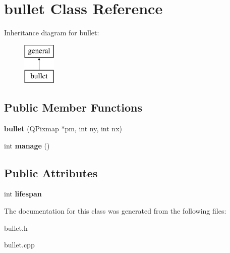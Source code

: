 \hypertarget{classbullet}{\section{bullet \-Class \-Reference}
\label{classbullet}
}
\-Inheritance diagram for bullet\-:\begin{figure}[H]
\begin{center}
\leavevmode
\includegraphics[height=2.000000cm]{classbullet}
\end{center}
\end{figure}
\subsection*{\-Public \-Member \-Functions}
\begin{DoxyCompactItemize}
\item 
\hypertarget{classbullet_aa62b1de309924a5a2daeb9ce7162068a}{{\bfseries bullet} (\-Q\-Pixmap $\ast$pm, int ny, int nx)}\label{classbullet_aa62b1de309924a5a2daeb9ce7162068a}

\item 
\hypertarget{classbullet_ae06a08d3012aec0b8454d2df38284cd0}{int {\bfseries manage} ()}\label{classbullet_ae06a08d3012aec0b8454d2df38284cd0}

\end{DoxyCompactItemize}
\subsection*{\-Public \-Attributes}
\begin{DoxyCompactItemize}
\item 
\hypertarget{classbullet_ad9834658c10d040ea1307a1289ff715c}{int {\bfseries lifespan}}\label{classbullet_ad9834658c10d040ea1307a1289ff715c}

\end{DoxyCompactItemize}


\-The documentation for this class was generated from the following files\-:\begin{DoxyCompactItemize}
\item 
bullet.\-h\item 
bullet.\-cpp\end{DoxyCompactItemize}
